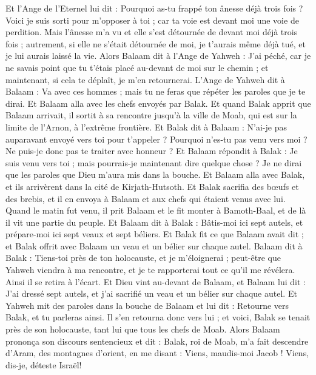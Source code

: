 \begin{multicols}{2}
Et l'Ange de l'Eternel lui dit : Pourquoi as-tu frappé ton ânesse déjà trois fois ? Voici je suis sorti pour m'opposer à toi ; car ta voie est devant moi une voie de perdition.
Mais l'ânesse m'a vu et elle s'est détournée de devant moi déjà trois fois ; autrement, si elle ne s'était détournée de moi, je t'aurais même déjà tué, et je lui aurais laissé la vie.
Alors Balaam dit à l'Ange de Yahweh : J'ai péché, car je ne savais point que tu t'étais placé au-devant de moi sur le chemin ; et maintenant, si cela te déplaît, je m'en retournerai.
L'Ange de Yahweh dit à Balaam : Va avec ces hommes ; mais tu ne feras que répéter les paroles que je te dirai. Et Balaam alla avec les chefs envoyés par Balak.
Et quand Balak apprit que Balaam arrivait, il sortit à sa rencontre jusqu'à la ville de Moab, qui est sur la limite de l'Arnon, à l'extrême frontière.
Et Balak dit à Balaam : N'ai-je pas auparavant envoyé vers toi pour t'appeler ? Pourquoi n'es-tu pas venu vers moi ? Ne puis-je donc pas te traiter avec honneur ?
Et Balaam répondit à Balak : Je suis venu vers toi ; mais pourrais-je maintenant dire quelque chose ? Je ne dirai que les paroles que Dieu m'aura mis dans la bouche.
Et Balaam alla avec Balak, et ils arrivèrent dans la cité de Kirjath-Hutsoth.
Et Balak sacrifia des bœufs et des brebis, et il en envoya à Balaam et aux chefs qui étaient venus avec lui.
Quand le matin fut venu, il prit Balaam et le fit monter à Bamoth-Baal, et de là il vit une partie du peuple.
\VerseOne{}Et Balaam dit à Balak : Bâtis-moi ici sept autels, et prépare-moi ici sept veaux et sept béliers.
Et Balak fit ce que Balaam avait dit ; et Balak offrit avec Balaam un veau et un bélier sur chaque autel.
Balaam dit à Balak : Tiens-toi près de ton holocauste, et je m'éloignerai ; peut-être que Yahweh viendra à ma rencontre, et je te rapporterai tout ce qu'il me révélera. Ainsi il se retira à l'écart.
Et Dieu vint au-devant de Balaam, et Balaam lui dit : J'ai dressé sept autels, et j'ai sacrifié un veau et un bélier sur chaque autel.
Et Yahweh mit des paroles dans la bouche de Balaam et lui dit : Retourne vers Balak, et tu parleras ainsi.
Il s'en retourna donc vers lui ; et voici, Balak se tenait près de son holocauste, tant lui que tous les chefs de Moab.
Alors Balaam prononça son discours sentencieux et dit : Balak, roi de Moab, m'a fait descendre d'Aram, des montagnes d'orient, en me disant : Viens, maudis-moi Jacob ! Viens, dis-je, déteste Israël!

\end{multicols}
